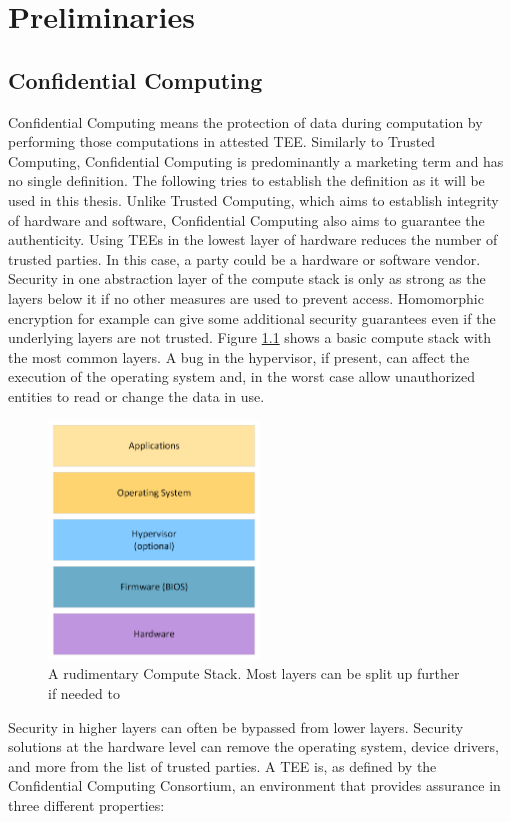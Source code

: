 \chapter{Preliminaries}
\label{ch:Foundations}

\section{Confidential Computing}
\label{sec:Foundations:ConfComputing}
Confidential Computing means the protection of data during computation by performing those computations in attested \Gls{TEE}. Similarly to Trusted Computing, Confidential Computing is predominantly a marketing term and has no single definition. The following tries to establish the definition as it will be used in this thesis. Unlike Trusted Computing, which aims to establish integrity of hardware and software, Confidential Computing also aims to guarantee the authenticity. Using \Gls{TEE}s in the lowest layer of hardware reduces the number of trusted parties. In this case, a party could be a hardware or software vendor. Security in one abstraction layer of the compute stack is only as strong as the layers below it if no other measures are used to prevent access. Homomorphic encryption for example can give some additional security guarantees even if the underlying layers are not trusted. Figure \ref{fig:computestack} shows a basic compute stack with the most common layers. A bug in the hypervisor, if present, can affect the execution of the operating system and, in the worst case allow unauthorized entities to read or change the data in use.
\begin{figure}
\centering
\includegraphics[width=0.5\textwidth]{figures/ComputeStack.png}
\caption{A rudimentary Compute Stack. Most layers can be split up further if needed to}
\label{fig:computestack}
\end{figure}Security in higher layers can often be bypassed from lower layers. Security solutions at the hardware level can remove the operating system, device drivers, and more from the list of trusted parties. A \Gls{TEE} is, as defined by the Confidential Computing Consortium, an environment that provides assurance in three different properties:
